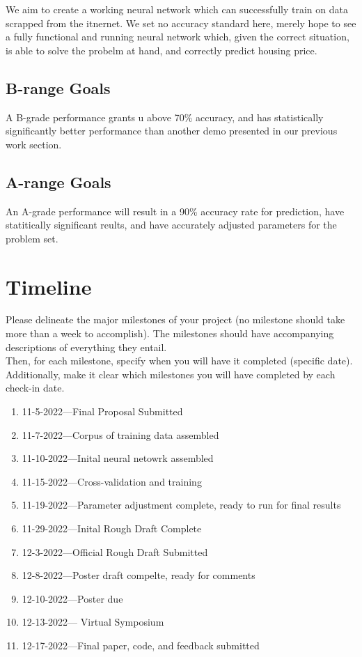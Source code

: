 \documentclass[]{article}
\begin{document}
We aim to create a working neural network which can successfully train on data scrapped from the itnernet.  We set no accuracy standard here, merely hope to see a fully functional and running neural network which, given the correct situation, is able to solve the probelm at hand, and correctly predict housing price.

\subsection{B-range Goals}

A B-grade performance grants u above 70\% accuracy, and has statistically significantly better performance than another demo presented in our previous work section.

\subsection{A-range Goals}

An A-grade performance will result in a 90\% accuracy rate for prediction, have statitically significant reults, and have accurately adjusted parameters for the problem set.


\section*{Timeline}
Please delineate the major milestones of your project (no milestone should take more than a week to accomplish). The milestones should have accompanying descriptions of everything they entail.\\

Then, for each milestone, specify when you will have it completed (specific date). Additionally, make it clear which milestones you will have completed by each check-in date.
\begin{enumerate}
        \item 11-5-2022---Final Proposal Submitted
        \item 11-7-2022---Corpus of training data assembled
        \item 11-10-2022---Inital neural netowrk assembled
        \item 11-15-2022---Cross-validation and training
        \item 11-19-2022---Parameter adjustment complete, ready to run for final results
        \item 11-29-2022---Inital Rough Draft Complete
        \item 12-3-2022---Official Rough Draft Submitted
        \item 12-8-2022---Poster draft compelte, ready for comments
        \item 12-10-2022---Poster due
        \item 12-13-2022--- Virtual Symposium
        \item 12-17-2022---Final paper, code, and feedback submitted
\end{enumerate}
\end{document}
